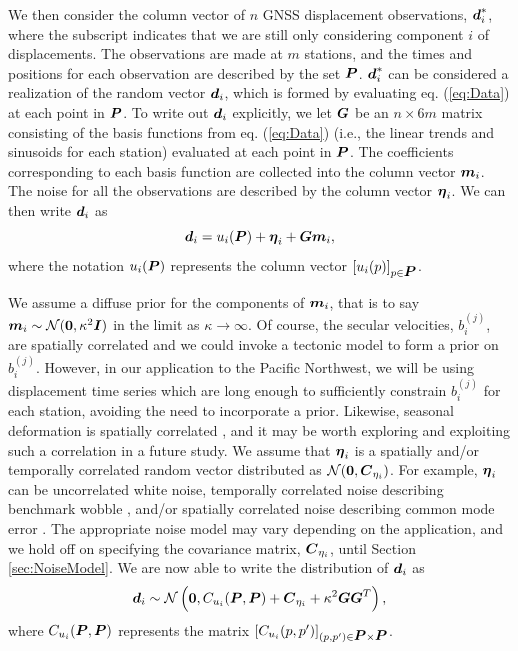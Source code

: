\documentclass[extra,mreferee]{gji}
\begin{document}

We then consider the column vector of $n$ GNSS displacement
observations, $\data^*_i$, where the subscript indicates that we are
still only considering component $i$ of displacements. The
observations are made at $m$ stations, and the times and positions for
each observation are described by the set $\points$. $\data^*_i$ can
be considered a realization of the random vector $\data_i$, which is
formed by evaluating eq. (\ref{eq:Data}) at each point in $\points$.
To write out $\data_i$ explicitly, we let $\G$ be an $n \times 6m$
matrix consisting of the basis functions from eq. (\ref{eq:Data})
(i.e., the linear trends and sinusoids for each station) evaluated at
each point in $\points$. The coefficients corresponding to each basis
function are collected into the column vector $\mitbf{m}_i$. The noise
for all the observations are described by the column vector
$\mitbf{\eta}_i$. We can then write $\data_i$ as
\begin{equation}\label{eq:DataVec}
\data_i = u_i(\points) + \mitbf{\eta}_i + \G\mitbf{m}_i,
\end{equation}
where the notation $u_i(\points)$ represents the column vector
$[u_i(p)]_{p \in \points}$.


We assume a diffuse prior for the components of $\mitbf{m}_i$, that is
to say $\mitbf{m}_i \sim \mathcal{N}(\zeros,\kappa^2\eye)$ in the
limit as $\kappa \to \infty$. Of course, the secular velocities,
$b_i^{(j)}$, are spatially correlated and we could invoke a tectonic
model to form a prior on $b_i^{(j)}$. However, in our application to
the Pacific Northwest, we will be using displacement time series which
are long enough to sufficiently constrain $b_i^{(j)}$ for each
station, avoiding the need to incorporate a prior. Likewise, seasonal
deformation is spatially correlated \citep{Dong2002,Langbein2008}, and
it may be worth exploring and exploiting such a correlation in a
future study. We assume that $\mitbf{\eta}_i$ is a spatially and/or
temporally correlated random vector distributed as
$\mathcal{N}(\zeros,\mitbf{C}_{\eta_i})$. For example,
$\mitbf{\eta}_i$ can be uncorrelated white noise, temporally
correlated noise describing benchmark wobble
\citep[e.g.,][]{Wyatt1982,Wyatt1989}, and/or spatially correlated
noise describing common mode error \citep[e.g.,][]{Wdowinski1997}. The
appropriate noise model may vary depending on the application, and we
hold off on specifying the covariance matrix, $\mitbf{C}_{\eta_i}$,
until Section \ref{sec:NoiseModel}. We are now able to write the
distribution of $\data_i$ as
\begin{equation}\label{eq:DataDist}
\data_i \sim \mathcal{N}\left(\zeros, C_{u_i}(\points,\points) + 
                                      \mitbf{C}_{\eta_i}  + 
                                      \kappa^2\G\G^T \right),
\end{equation}
where $C_{u_i}(\points,\points)$ represents the matrix
$[C_{u_i}(p,p')]_{(p,p') \in \points \times \points}$.
\end{document}
